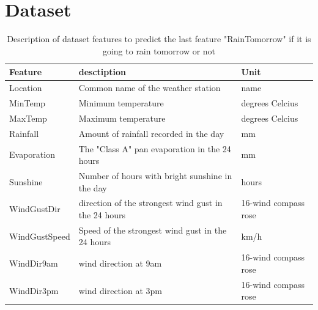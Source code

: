 \documentclass[11pt]{article}
\begin{document}
\newpage
\appendix
\section{Dataset}
\label{app:dataset}
\begin{table}[H]
    \begin{small}
        \caption{Description of dataset features to predict the last feature "RainTomorrow" if it is going to rain tomorrow or not }
        \label{tab:features}
        \begin{center}
            \begin{tabular}{|l|l|l|}
                \hline
                \textbf{Feature} & \textbf{desctiption}                                 & \textbf{Unit}           \\
                \hline
                \hline
                Location         & Common name of the weather station                   & name                    \\
                \hline
                MinTemp          & Minimum temperature                                  & degrees Celcius         \\
                \hline
                MaxTemp          & Maximum temperature                                  & degrees Celcius         \\
                \hline
                Rainfall         & Amount of rainfall recorded in the day               & mm                      \\
                \hline
                Evaporation      & The "Class A" pan evaporation in the 24 hours        & mm                      \\
                \hline
                Sunshine         & Number of hours with bright sunshine in the day      & hours                   \\
                \hline
                WindGustDir      & direction of the strongest wind gust in the 24 hours & 16-wind compass rose    \\
                \hline
                WindGustSpeed    & Speed of the strongest wind gust in the 24 hours     & km/h                    \\
                \hline
                WindDir9am       & wind direction at 9am                                & 16-wind compass rose    \\
                \hline
                WindDir3pm       & wind direction at 3pm                                & 16-wind compass rose    \\

\end{tabular}
\end{center}
\end{small}
\end{table}
\end{document}
